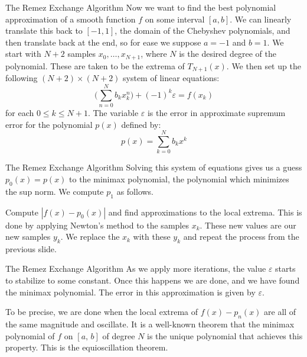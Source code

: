 \documentclass{beamer}
\begin{document}
    \begin{frame}{The Remez Exchange Algorithm}
        Now we want to find the best polynomial approximation of a smooth
        function $f$ on some interval $[a,b]$. We can linearly translate this
        back to $[-1,1]$, the domain of the Chebyshev polynomials, and then
        translate back at the end, so for ease we suppose $a=-1$ and $b=1$.
        We start with $N+2$ samples $x_{0},\dots,x_{N+1}$, where $N$ is the
        desired degree of the polynomial. These are taken to be the extrema of
        $T_{N+1}(x)$. We then set up the following $(N+2)\times(N+2)$ system of
        linear equations:
        \begin{equation}
            \Big(\sum_{n=0}^{N}b_{k}x_{k}^{n}\Big)+(-1)^{k}\varepsilon=f(x_{k})
        \end{equation}
        for each $0\leq{k}\leq{N+1}$. The variable $\varepsilon$ is the error in
        approximate supremum error for the polynomial $p(x)$ defined by:
        \begin{equation}
            p(x)=\sum_{k=0}^{N}b_{k}x^{k}
        \end{equation}
    \end{frame}
    \begin{frame}{The Remez Exchange Algorithm}
        Solving this system of equations gives us a guess $p_{0}(x)=p(x)$ to
        the minimax polynomial, the polynomial which minimizes the sup norm.
        We compute $p_{1}$ as follows.
        \par\hfill\par
        Compute $|f(x)-p_{0}(x)|$ and find approximations to the local
        extrema. This is done by applying Newton's method to the samples
        $x_{k}$. These new values are our new samples $y_{k}$. We replace the
        $x_{k}$ with these $y_{k}$ and repeat the process from the previous
        slide.
    \end{frame}
    \begin{frame}{The Remez Exchange Algorithm}
        As we apply more iterations, the value $\varepsilon$ starts to stabilize
        to some constant. Once this happens we are done, and we have found the
        minimax polynomial. The error in this approximation is given by
        $\varepsilon$.
        \par\hfill\par
        To be precise, we are done when the local extrema of $f(x)-p_{n}(x)$
        are all of the same magnitude and oscillate. It is a well-known theorem
        that the minimax polynomial of $f$ on $[a,\,b]$ of degree $N$ is the
        unique polynomial that achieves this property. This is the
        equioscillation theorem.
    \end{frame}
\end{document}
